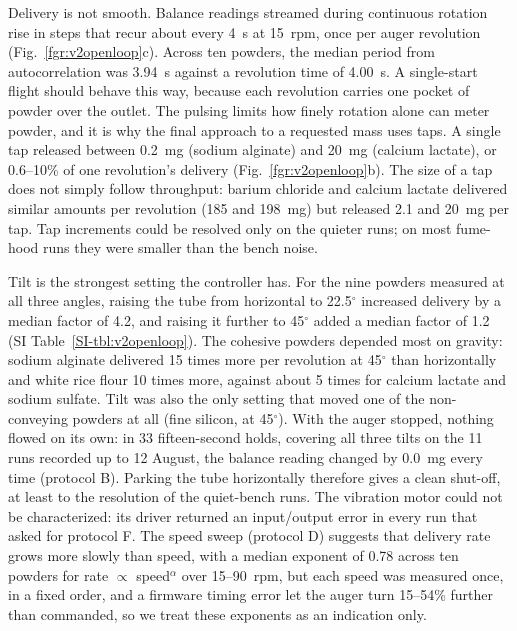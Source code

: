 \documentclass[twoside,twocolumn,9pt]{article}
\newcommand{\siref}[1]{\ref*{SI-#1}}
\begin{document}
Delivery is not smooth. Balance readings streamed during continuous rotation rise in steps that recur about every 4~s at 15~rpm, once per auger revolution (Fig.~\ref{fgr:v2openloop}c). Across ten powders, the median period from autocorrelation was 3.94~s against a revolution time of 4.00~s. A single-start flight should behave this way, because each revolution carries one pocket of powder over the outlet. The pulsing limits how finely rotation alone can meter powder, and it is why the final approach to a requested mass uses taps. A single tap released between 0.2~mg (sodium alginate) and 20~mg (calcium lactate), or 0.6--10\% of one revolution's delivery (Fig.~\ref{fgr:v2openloop}b). The size of a tap does not simply follow throughput: barium chloride and calcium lactate delivered similar amounts per revolution (185 and 198~mg) but released 2.1 and 20~mg per tap. Tap increments could be resolved only on the quieter runs; on most fume-hood runs they were smaller than the bench noise.

Tilt is the strongest setting the controller has. For the nine powders measured at all three angles, raising the tube from horizontal to 22.5$^\circ$ increased delivery by a median factor of 4.2, and raising it further to 45$^\circ$ added a median factor of 1.2 (SI Table~\siref{tbl:v2openloop}). The cohesive powders depended most on gravity: sodium alginate delivered 15 times more per revolution at 45$^\circ$ than horizontally and white rice flour 10 times more, against about 5 times for calcium lactate and sodium sulfate. Tilt was also the only setting that moved one of the non-conveying powders at all (fine silicon, at 45$^\circ$). With the auger stopped, nothing flowed on its own: in 33 fifteen-second holds, covering all three tilts on the 11 runs recorded up to 12 August, the balance reading changed by 0.0~mg every time (protocol B). Parking the tube horizontally therefore gives a clean shut-off, at least to the resolution of the quiet-bench runs. The vibration motor could not be characterized: its driver returned an input/output error in every run that asked for protocol F. The speed sweep (protocol D) suggests that delivery rate grows more slowly than speed, with a median exponent of 0.78 across ten powders for rate $\propto$ speed$^{\alpha}$ over 15--90~rpm, but each speed was measured once, in a fixed order, and a firmware timing error let the auger turn 15--54\% further than commanded, so we treat these exponents as an indication only.
\end{document}
